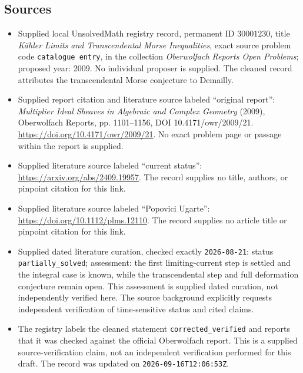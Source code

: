 \documentclass[11pt]{article}
\begin{document}
\subsection{Sources}
\begin{itemize}
\item Supplied local UnsolvedMath registry record, permanent ID \(30001230\), title \emph{Kähler Limits and Transcendental Morse Inequalities}, exact source problem code \texttt{catalogue entry}, in the collection \emph{Oberwolfach Reports Open Problems}; proposed year: 2009. No individual proposer is supplied. The cleaned record attributes the transcendental Morse conjecture to Demailly.
\item Supplied report citation and literature source labeled ``original report'': \emph{Multiplier Ideal Sheaves in Algebraic and Complex Geometry} (2009), Oberwolfach Reports, pp. 1101--1156, DOI 10.4171/owr/2009/21. \url{https://doi.org/10.4171/owr/2009/21}. No exact problem page or passage within the report is supplied.
\item Supplied literature source labeled ``current status'': \url{https://arxiv.org/abs/2409.19957}. The record supplies no title, authors, or pinpoint citation for this link.
\item Supplied literature source labeled ``Popovici Ugarte'': \url{https://doi.org/10.1112/plms.12110}. The record supplies no article title or pinpoint citation for this link.
\item Supplied dated literature curation, checked exactly \texttt{2026-08-21}: status \texttt{partially\_solved}; assessment: the first limiting-current step is settled and the integral case is known, while the transcendental step and full deformation conjecture remain open. This assessment is supplied dated curation, not independently verified here. The source background explicitly requests independent verification of time-sensitive status and cited claims.
\item The registry labels the cleaned statement \texttt{corrected\_verified} and reports that it was checked against the official Oberwolfach report. This is a supplied source-verification claim, not an independent verification performed for this draft. The record was updated on \texttt{2026-09-16T12:06:53Z}.
\end{itemize}
\end{document}
